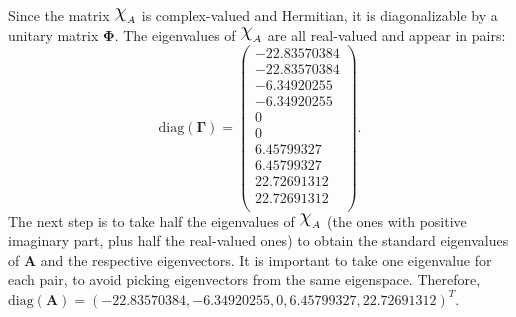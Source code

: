 Since the matrix $\rchi_A$ is complex-valued and Hermitian, it is diagonalizable by a unitary matrix $\mathbf{\Phi}$. The eigenvalues of $\rchi_A$ are all real-valued and appear in pairs:
\begin{equation*}
\mathrm{diag}(\mathbf{\Gamma}) = \begin{pmatrix}
-22.83570384 \\
-22.83570384 \\
-6.34920255 \\
-6.34920255 \\
0 \\
0 \\
6.45799327 \\
6.45799327 \\
22.72691312 \\
22.72691312 \\
\end{pmatrix}.
\end{equation*}
The next step is to take half the eigenvalues of $\rchi_A$ (the ones with positive imaginary part, plus half the real-valued ones) to obtain the standard eigenvalues of $\mathbf{A}$ and the respective eigenvectors. It is important to take one eigenvalue for each pair, to avoid picking eigenvectors from the same eigenspace. Therefore, $\mathrm{diag}(\mathbf{A}) = (-22.83570384, -6.34920255, 0, 6.45799327, 22.72691312)^T$.

